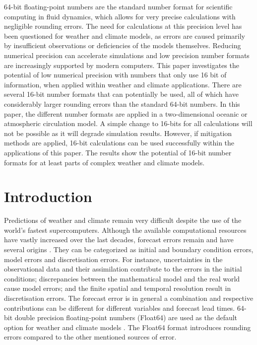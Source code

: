 \documentclass[draft]{agujournal2019}
\begin{document}
64-bit floating-point numbers are the standard number format for scientific
computing in fluid dynamics, which allows for very precise calculations with
negligible rounding errors. The need for calculations at this precision level
has been questioned for weather and climate models, as errors are caused
primarily by insufficient observations or deficiencies of the models themselves.
Reducing numerical precision can accelerate simulations and low precision number
formats are increasingly supported by modern computers. This paper investigates
the potential of low numerical precision with numbers that only use 16 bit of
information, when applied within weather and climate applications. There are
several 16-bit number formats that can potentially be used, all of which have
considerably larger rounding errors than the standard 64-bit numbers. In this
paper, the different number formats are applied in a two-dimensional oceanic or
atmospheric circulation model. A simple change to 16-bits for all calculations
will not be possible as it will degrade simulation results. However, if mitigation
methods are applied, 16-bit calculations can be used successfully within the
applications of this paper. The results show the potential of 16-bit number
formats for at least parts of complex weather and climate models.

\section{Introduction}
\label{sec:intro}

Predictions of weather and climate remain very difficult despite the use of the
world's fastest supercomputers. Although the available computational resources
have vastly increased over the last decades, forecast errors remain and have
several origins \cite{Palmer2012,Palmer2015}. They can be categorized as
initial and boundary condition errors, model errors and discretisation errors.
For instance, uncertainties in the observational data and their
assimilation contribute to the errors in the initial conditions; discrepancies
between the mathematical model and the real world cause model errors; and the finite
spatial and temporal resolution result in discretisation errors. The forecast error
is in general a combination and respective contributions can be different for
different variables and forecast lead times. 64-bit double precision floating-point
numbers (Float64) are used as the default option for weather and climate models . The Float64 format introduces rounding errors  compared to the
other mentioned sources of error.
\end{document}
